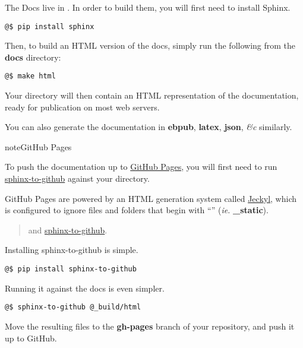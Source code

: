 \documentclass[a4paper,12pt,english]{sphinxmanual}
\begin{document}
The Docs live in . In order to build them, you will first need to install Sphinx.

\begin{Verbatim}[commandchars=@\[\]]
@$ pip install sphinx
\end{Verbatim}

Then, to build an HTML version of the docs, simply run the following from the \textbf{docs} directory:

\begin{Verbatim}[commandchars=@\[\]]
@$ make html
\end{Verbatim}

Your  directory will then contain an HTML representation of the documentation, ready for publication on most web servers.

You can also generate the documentation in \textbf{ebpub}, \textbf{latex}, \textbf{json}, \emph{\&c} similarly.

\begin{notice}{note}{GitHub Pages}

To push the documentation up to \href{http://pages.github.com}{GitHub Pages}, you will first need to run \href{http://github.com/michaeljones/sphinx-to-github}{sphinx-to-github} against your  directory.

GitHub Pages are powered by an HTML generation system called \href{http://github.com/mojombo/jekyll}{Jeckyl}, which is configured to ignore files and folders that begin with ``\code{\_}'' (\emph{ie.} \textbf{\_static}).
\begin{quote}

and \href{http://github.com/michaeljones/sphinx-to-github}{sphinx-to-github}.
\end{quote}

Installing sphinx-to-github is simple.

\begin{Verbatim}[commandchars=@\[\]]
@$ pip install sphinx-to-github
\end{Verbatim}

Running it against the docs is even simpler.

\begin{Verbatim}[commandchars=@\[\]]
@$ sphinx-to-github @_build/html
\end{Verbatim}

Move the resulting files to the \textbf{gh-pages} branch of your repository, and push it up to GitHub.
\end{notice}
\end{document}
